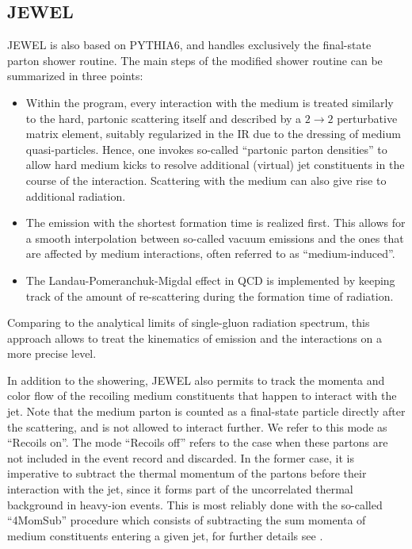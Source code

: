 \subsection{JEWEL}
\label{app:jewel}

JEWEL is also based on PYTHIA6, and handles exclusively the final-state parton shower routine. The main steps of the modified shower routine can be summarized in three points:
\begin{itemize}

\item Within the program, every interaction with the medium is treated similarly to the hard, partonic scattering itself and described by a $2 \to 2$ perturbative matrix element, suitably regularized in the IR due to the dressing of medium quasi-particles. Hence, one invokes so-called ``partonic parton densities'' to allow hard medium kicks to resolve additional (virtual) jet constituents in the course of the interaction. Scattering with the medium can also give rise to additional radiation.

\item The emission with the shortest formation time is realized first. This allows for a smooth interpolation between so-called vacuum emissions and the ones that are affected by medium interactions, often referred to as ``medium-induced''.

\item The Landau-Pomeranchuk-Migdal effect in QCD \cite{Wang:1994fx} is implemented by keeping track of the amount of re-scattering during the formation time of radiation.
\end{itemize}
Comparing to the analytical limits of single-gluon radiation spectrum, this approach allows to treat the kinematics of emission and the interactions on a more precise level.

In addition to the showering, JEWEL also permits to track the momenta and color flow of the recoiling medium constituents that happen to interact with the jet. Note that the medium parton is counted as a final-state particle directly after the scattering, and is not allowed to interact further. We refer to this mode as ``Recoils on''. The mode ``Recoils off'' refers to the case when these partons are not included in the event record and discarded. In the former case, it is imperative to subtract the thermal momentum of the partons before their interaction with the jet, since it forms part of the uncorrelated  thermal background in heavy-ion events. This is most reliably done with the so-called ``4MomSub'' procedure which consists of subtracting the sum momenta of medium constituents entering a given jet, for further details see \cite{KunnawalkamElayavalli:2017hxo}. 
